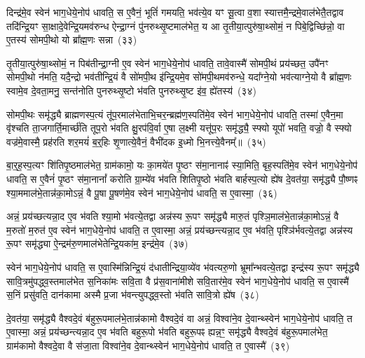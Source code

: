 दिन्द्र॑मे॒व स्वेन॑ भाग॒\-धेये॒नोप॑ धावति॒ स ए॒वैनं॒ भूतिं॑ गमयति॒ भव॑त्ये॒व यꣳ सू॒त्वा व॒शा स्यात्तमै॒न्द्रमे॒वाल॑भेतै॒तद्वाव तदि॑न्द्रि॒यꣳ सा॒क्षादे॒वेन्द्रि॒यमव॑रुन्ध ऐन्द्रा॒ग्नं पु॑नरुथ्सृ॒ष्टमा\-ल॑भेत॒ य आ तृ॒तीया॒त्पुरु॑षा॒थ्सोमं॒ न पिबे॒द्विच्छि॑न्नो॒ वा ए॒तस्य॑ सोमपी॒थो यो ब्रा᳚ह्म॒णः सन्ना~(३३)\ip

तृ॒तीया॒त्पुरु॑षा॒थ्सोमं॒ न पिब॑तीन्द्रा॒ग्नी ए॒व स्वेन॑ भाग॒\-धेये॒नोप॑ धावति॒ तावे॒वास्मै॑ सोमपी॒थं प्रय॑च्छत॒ उपै॑नꣳ सोमपी॒थो न॑मति॒ यदै॒न्द्रो भव॑तीन्द्रि॒यं वै सो॑मपी॒थ इ॑न्द्रि॒यमे॒व सो॑मपी॒थमव॑\-रुन्धे॒ यदा᳚ग्ने॒यो भव॑त्याग्ने॒यो वै ब्रा᳚ह्म॒णः स्वामे॒व दे॒वता॒मनु॒ सन्त॑नोति पुनरुथ्सृ॒ष्टो भ॑वति पुनरुथ्सृ॒ष्ट इ॑व॒ ह्ये॑तस्य॑~(३४)\ip

सोमपी॒थः समृ॑द्ध्यै ब्राह्मणस्प॒त्यं तू॑प॒रमाल॑भेताभि॒\-चर॒न्ब्रह्म॑ण॒स्पति॑मे॒व स्वेन॑ भाग॒\-धेये॒नोप॑ धावति॒ तस्मा॑ ए॒वैन॒मा वृ॑श्चति ता॒जगार्ति॒मार्च्छ॑ति तूप॒रो भ॑वति क्षु॒रप॑वि॒र्वा ए॒षा ल॒क्ष्मी यत्तू॑प॒रः समृ॑द्ध्यै॒ स्फ्यो यूपो॑ भवति॒ वज्रो॒ वै स्फ्यो वज्र॑मे॒वास्मै॒ प्रह॑रति शर॒मयं॑ ब॒र्॒\mbox{}हिः शृ॒णात्ये॒वैनं॒ वैभी॑दक इ॒ध्मो भि॒नत्त्ये॒वैनम्᳚॥~(३५)\ip

{}

बा॒र्॒\mbox{}ह॒स्प॒त्यꣳ शि॑तिपृ॒ष्ठमा\-ल॑भेत॒ ग्राम॑कामो॒ यः का॒मये॑त पृ॒ष्ठꣳ स॑मा॒नानाꣴ॑ स्या॒मिति॒ बृह॒स्पति॑मे॒व स्वेन॑ भाग॒\-धेये॒नोप॑ धावति॒ स ए॒वैनं॑ पृ॒ष्ठꣳ स॑मा॒नानां᳚ करोति ग्रा॒म्ये॑व भ॑वति शितिपृ॒ष्ठो भ॑वति बार्\mbox{}हस्प॒त्यो ह्ये॑ष दे॒वत॑या॒ समृ॑द्ध्यै पौ॒ष्णꣴ श्या॒ममाल॑भे॒तान्न॑का॒मो\-ऽन्नं॒ वै पू॒षा पू॒षण॑मे॒व स्वेन॑ भाग॒\-धेये॒नोप॑ धावति॒ स ए॒वास्मा॒~(३६)\ip

अन्नं॒ प्रय॑च्छत्यन्ना॒द ए॒व भ॑वति श्या॒मो भ॑वत्ये॒तद्वा अन्न॑स्य रू॒पꣳ समृ॑द्ध्यै मारु॒तं पृश्ञि॒माल॑भे॒तान्न॑का॒मो\-ऽन्नं॒ वै म॒रुतो॑ म॒रुत॑ ए॒व स्वेन॑ भाग॒\-धेये॒नोप॑ धावति॒ त ए॒वास्मा॒ अन्नं॒ प्रय॑च्छन्त्यन्ना॒द ए॒व भ॑वति॒ पृश्ञि॑र्भवत्ये॒तद्वा अन्न॑स्य रू॒पꣳ समृ॑द्ध्या ऐ॒न्द्रम॑रु॒णमाल॑भेतेन्द्रि॒यका॑म॒ इन्द्र॑मे॒व~(३७)\ip

स्वेन॑ भाग॒\-धेये॒नोप॑ धावति॒ स ए॒वास्मि॑न्निन्द्रि॒यं द॑धातीन्द्रिया॒\-व्ये॑व भ॑वत्यरु॒णो भ्रूमा᳚न्भवत्ये॒तद्वा इन्द्र॑स्य रू॒पꣳ समृ॑द्ध्यै सावि॒त्र\-मु॑प\-द्ध्व॒स्तमाल॑भेत स॒निका॑मः सवि॒ता वै प्र॑स॒वाना॑मीशे सवि॒तार॑मे॒व स्वेन॑ भाग॒\-धेये॒नोप॑ धावति॒ स ए॒वास्मै॑ स॒निं प्रसु॑वति॒ दान॑कामा अस्मै प्र॒जा भ॑वन्त्युपद्ध्व॒स्तो भ॑वति सावि॒त्रो ह्ये॑ष~(३८)\ip

दे॒वत॑या॒ समृ॑द्ध्यै वैश्वदे॒वं ब॑हुरू॒पमाल॑भे॒तान्न॑कामो वैश्वदे॒वं वा अन्नं॒ विश्वा॑ने॒व दे॒वान्थ्स्वेन॑ भाग॒\-धेये॒नोप॑ धावति॒ त ए॒वास्मा॒ अन्नं॒ प्रय॑च्छन्त्यन्ना॒द ए॒व भ॑वति बहुरू॒पो भ॑वति बहुरू॒पꣴ ह्यन्न॒ꣳ॒ समृ॑द्ध्यै वैश्वदे॒वं ब॑हुरू॒पमा\-ल॑भेत॒ ग्राम॑कामो वैश्वदे॒वा वै स॑जा॒ता विश्वा॑ने॒व दे॒वान्थ्स्वेन॑ भाग॒\-धेये॒नोप॑ धावति॒ त ए॒वास्मै॑~(३९)\ip

